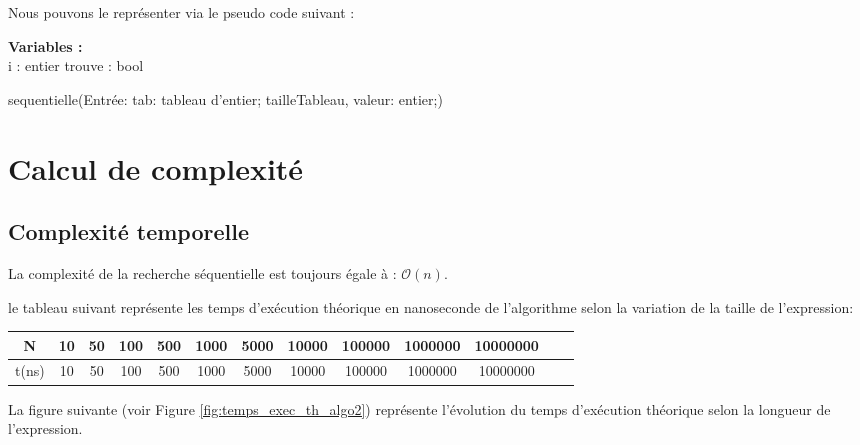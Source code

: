 \par
Nous pouvons le représenter via le pseudo code suivant :


\begin{function}[H]
    \textbf{Variables :}\\
    i : entier\;
    trouve : bool\;
    \caption{sequentielle(Entrée: tab: tableau d'entier; tailleTableau, valeur: entier;)}
\end{function}







\section{Calcul de complexité}
\subsection{Complexité temporelle}
La complexité de la recherche séquentielle est toujours égale à : $\mathcal{O}(n)$.

le tableau suivant représente les temps d'exécution théorique en nanoseconde de l'algorithme selon la variation de la taille de l'expression:

\small
\begin{center}
\begin{tabular}{| c | c | c | c | c | c | c | c | c | c | c | c | c |}
    \hline
    N & 10 & 50 & 100 & 500 & 1000 & 5000 & 10000 & 100000 & 1000000 & 10000000 \\
    \hline
    t(ns) & 10 & 50 & 100 & 500 & 1000 & 5000 & 10000 & 100000 & 1000000 & 10000000 \\
    \hline
\end{tabular}  
\end{center}

La figure suivante (voir Figure \ref{fig:temps_exec_th_algo2}) représente l'évolution du temps d'exécution théorique selon la longueur de l'expression.

